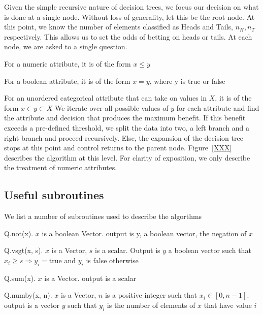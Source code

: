 Given the simple recursive nature of decision trees, we focus our 
decision on what is done at a single node. Without loss of generality, 
let this be the root node. At this point, we know the number of elements
classified as Heads and Tails, \(n_H, n_T\) respectively. This allows us to set
the odds of betting on heads or tails. At each node, we are asked to a single
question. 
\bi
\item For a numeric attribute, it is of the form \(x \leq y\)
\item For a boolean attribute, it is of the form \(x = y\), where y is true or
false
\item For an unordered categorical attribute that can take on values in \(X\),
it is of the form \(x \in y \subset X\)
\ei
We iterate over all possible values of \(y\) for each attribute and find the
attribute and decision that produces the maximum benefit. If this benefit
exceeds a pre-defined threshold, we split the data into two, a left branch and a
right branch and proceed recursively. Else, the expansion of the decision tree
stops at this point and control returns to the parent node. 
Figure~\ref{XXX} describes the algorithm at this level. For clarity of 
exposition, we only describe the treatment of numeric attributes.



\subsection{Useful subroutines}
We list a number of subroutines used to describe the algorthms
\be
\item Q.not(x). \(x\) is a boolean Vector. output is y, a boolean vector, the
negation of \(x\)
\item Q.vsgt(x, s). \(x\) is a Vector, \(s\) is a scalar. Output is \(y\) a
boolean vector such that \(x_i \geq s \Rightarrow y_i = \mathrm{true}\) and
\(y_i\) is false otherwise
\item Q.sum(x). \(x\) is a Vector. output is a scalar
\item Q.numby(x, n). \(x\) is a Vector, \(n\) is a positive integer 
such that \(x_i \in [0, n-1]\). output is a vector \(y\) such that \(y_i\) is
the number of elements of \(x\) that have value \(i\)
\ee

